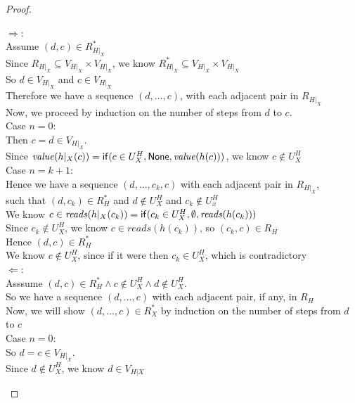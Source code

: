 \begin{proof}

\begin{tabbedproof}
\oo $\Rightarrow$: \\
\ooo Assume $(d,c) \in R^*_{H|_X}$ \\
\ooo Since $R_{H|_X} \subseteq V_{H|_X} \times V_{H|_X}$, we know $R^\ast_{H|_X} \subseteq V_{H|_X} \times V_{H|_X}$ \\
\ooo So $d \in V_{H|_X}$ and $c \in V_{H|_X}$ \\
\ooo Therefore we have a sequence $(d, \ldots, c)$, with each adjacent pair in $R_{H|_X}$ \\
\ooo Now, we proceed by induction on the number of steps from $d$ to $c$. \\
\ooo Case $n = 0$: \\
\oooo Then $c = d \in V_{H|_X}$.\\
\oooo Since $\mathit{value}(h|_{X}(c)) = \mathsf{if}({c \in U^H_X}, {\mathsf{None}}, {\mathit{value}(h(c))})$, we know $c \not\in U^H_X$ \\
\ooo Case $n = k+1$: \\
\oooo Hence we have a sequence $(d, \ldots, c_k, c)$ with each adjacent pair in $R_{H|_X}$, \\
\oooo such that $(d, c_k) \in R^*_H$ and $d \not \in U^H_X$ and $c_k \not \in U^H_x$ \\ 
\oooo We know $c \in \mathit{reads}(h|_X(c_k)) = \mathsf{if}({c_k \in U^H_X}, {\emptyset}, {\mathit{reads}(h(c_k))})$ \\
\oooo Since $c_k \not \in U^H_X$, we know $c \in \mathit{reads}(h(c_k))$, so $(c_k, c) \in R_H$ \\
\oooo Hence $(d, c) \in R^*_H$ \\
\oooo We know $c \not \in U^H_X$, since if it were then $c_k \in U^H_X$, which is contradictory \\
\oo $\Leftarrow$: \\
\ooo Asssume $(d,c) \in R^*_H \land c \not\in U^H_X \land d \not\in U^H_X$. \\
\ooo So we have a sequence $(d, \ldots, c)$ with each adjacent pair, if any, in $R_H$ \\
\ooo Now, we will show $(d, \ldots, c) \in R^*_X$ by induction on the number of steps from $d$ to $c$ \\
\ooo Case $n = 0$: \\
\oooo So $d = c \in V_{H|_X}$. \\
\oooo Since $d \not\in U^H_X$, we know $d \in V_{H|X}$ \\

\end{tabbedproof}
\end{proof}
